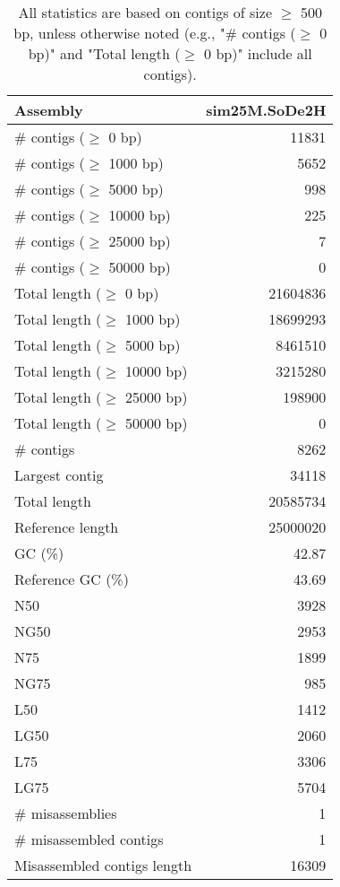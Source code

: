\documentclass[12pt,a4paper]{article}
\begin{document}
\begin{table}[ht]
\begin{center}
\caption{All statistics are based on contigs of size $\geq$ 500 bp, unless otherwise noted (e.g., "\# contigs ($\geq$ 0 bp)" and "Total length ($\geq$ 0 bp)" include all contigs).}
\begin{tabular}{|l*{1}{|r}|}
\hline
Assembly & sim25M.SoDe2H \\ \hline
\# contigs ($\geq$ 0 bp) & 11831 \\ \hline
\# contigs ($\geq$ 1000 bp) & 5652 \\ \hline
\# contigs ($\geq$ 5000 bp) & 998 \\ \hline
\# contigs ($\geq$ 10000 bp) & 225 \\ \hline
\# contigs ($\geq$ 25000 bp) & 7 \\ \hline
\# contigs ($\geq$ 50000 bp) & 0 \\ \hline
Total length ($\geq$ 0 bp) & 21604836 \\ \hline
Total length ($\geq$ 1000 bp) & 18699293 \\ \hline
Total length ($\geq$ 5000 bp) & 8461510 \\ \hline
Total length ($\geq$ 10000 bp) & 3215280 \\ \hline
Total length ($\geq$ 25000 bp) & 198900 \\ \hline
Total length ($\geq$ 50000 bp) & 0 \\ \hline
\# contigs & 8262 \\ \hline
Largest contig & 34118 \\ \hline
Total length & 20585734 \\ \hline
Reference length & 25000020 \\ \hline
GC (\%) & 42.87 \\ \hline
Reference GC (\%) & 43.69 \\ \hline
N50 & 3928 \\ \hline
NG50 & 2953 \\ \hline
N75 & 1899 \\ \hline
NG75 & 985 \\ \hline
L50 & 1412 \\ \hline
LG50 & 2060 \\ \hline
L75 & 3306 \\ \hline
LG75 & 5704 \\ \hline
\# misassemblies & 1 \\ \hline
\# misassembled contigs & 1 \\ \hline
Misassembled contigs length & 16309 \\ \hline

\end{tabular}
\end{center}
\end{table}
\end{document}
